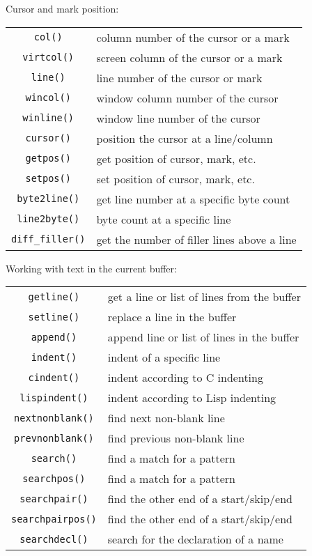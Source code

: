 Cursor and mark position:
\label{cursor-functions}
\label{mark-functions}
\begin{center} \begin{tabular}{c l}
				\verb!col()! & column number of the cursor or a mark \\
				\verb!virtcol()! & screen column of the cursor or a mark \\
				\verb!line()! & line number of the cursor or mark \\
				\verb!wincol()! & window column number of the cursor \\
				\verb!winline()! & window line number of the cursor \\
				\verb!cursor()! & position the cursor at a line/column \\
				\verb!getpos()! & get position of cursor, mark, etc. \\
				\verb!setpos()! & set position of cursor, mark, etc. \\
				\verb!byte2line()! & get line number at a specific byte count \\
				\verb!line2byte()! & byte count at a specific line \\
				\verb!diff_filler()! & get the number of filler lines above a line \\
\end{tabular} \end{center}

Working with text in the current buffer:
\label{text-functions}
\begin{center} \begin{tabular}{c l}
				\verb!getline()! & get a line or list of lines from the buffer \\
				\verb!setline()! & replace a line in the buffer \\
				\verb!append()! & append line or list of lines in the buffer \\
				\verb!indent()! & indent of a specific line \\
				\verb!cindent()! & indent according to C indenting \\
				\verb!lispindent()! & indent according to Lisp indenting \\
				\verb!nextnonblank()! & find next non-blank line \\
				\verb!prevnonblank()! & find previous non-blank line \\
				\verb!search()! & find a match for a pattern \\
				\verb!searchpos()! & find a match for a pattern \\
				\verb!searchpair()! & find the other end of a start/skip/end \\
				\verb!searchpairpos()! & find the other end of a start/skip/end \\
				\verb!searchdecl()! & search for the declaration of a name \\
\end{tabular} \end{center}

